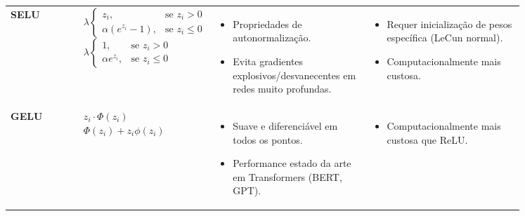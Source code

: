 \begin{longtable}{@{} l p{0.25\linewidth} p{0.3\linewidth} p{0.3\linewidth} @{}}
    \textbf{SELU} &
    $\lambda \begin{cases}z_i, & \text{se } z_i > 0 \\ \alpha (e^{z_i} - 1) , & \text{se } z_i \le 0\end{cases}$ \newline\vspace{0.2cm}
    $ \lambda \begin{cases}1, & \text{se } z_i > 0 \\ \alpha e^{z_i}, & \text{se } z_i \le 0\end{cases}$
    &
    \begin{itemize}[noitemsep, topsep=0pt, partopsep=0pt, leftmargin=*]
        \item Propriedades de autonormalização.
        \item Evita gradientes explosivos/desvanecentes em redes muito profundas.
    \end{itemize}
    &
    \begin{itemize}[noitemsep, topsep=0pt, partopsep=0pt, leftmargin=*]
        \item Requer inicialização de pesos específica (LeCun normal).
        \item Computacionalmente mais custosa.
    \end{itemize}
    \\ \addlinespace

    \textbf{GELU} &
    $z_i \cdot \Phi(z_i)$ \newline\vspace{0.2cm}
    $ \Phi(z_i) + z_i\phi(z_i)$
    &
    \begin{itemize}[noitemsep, topsep=0pt, partopsep=0pt, leftmargin=*]
        \item Suave e diferenciável em todos os pontos.
        \item Performance estado da arte em Transformers (BERT, GPT).
    \end{itemize}
    &
    \begin{itemize}[noitemsep, topsep=0pt, partopsep=0pt, leftmargin=*]
        \item Computacionalmente mais custosa que ReLU.
    \end{itemize}
    \\
    
\end{longtable}
